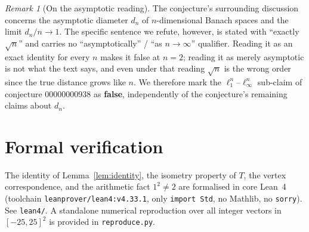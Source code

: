 \documentclass[11pt]{article}
\theoremstyle{definition}
\theoremstyle{remark}
\newtheorem{remark}[theorem]{Remark}
\newcommand{\linf}{\ell_\infty}
\newcommand{\lone}{\ell_1}
\begin{document}
\begin{remark}[On the asymptotic reading]
The conjecture's surrounding discussion concerns the asymptotic diameter
$d_n$ of $n$-dimensional Banach spaces and the limit $d_n/n\to1$. The specific
sentence we refute, however, is stated with ``exactly $\sqrt n$'' and carries
no ``asymptotically'' / ``as $n\to\infty$'' qualifier. Reading it as an exact
identity for every $n$ makes it false at $n=2$; reading it as merely asymptotic
is not what the text says, and even under that reading $\sqrt n$ is the wrong
order since the true distance grows like $n$. We therefore mark the
$\lone^n$--$\linf^n$ sub-claim of conjecture 00000000938 as \textbf{false},
independently of the conjecture's remaining claims about $d_n$.
\end{remark}

\section{Formal verification}

The identity of Lemma~\ref{lem:identity}, the isometry property of $T$, the
vertex correspondence, and the arithmetic fact $1^2\neq2$ are formalised in
core Lean~4 (toolchain \texttt{leanprover/lean4:v4.33.1}, only
\texttt{import Std}, no Mathlib, no \texttt{sorry}). See \texttt{lean4/}. A
standalone numerical reproduction over all integer vectors in $[-25,25]^2$ is
provided in \texttt{reproduce.py}.
\end{document}
